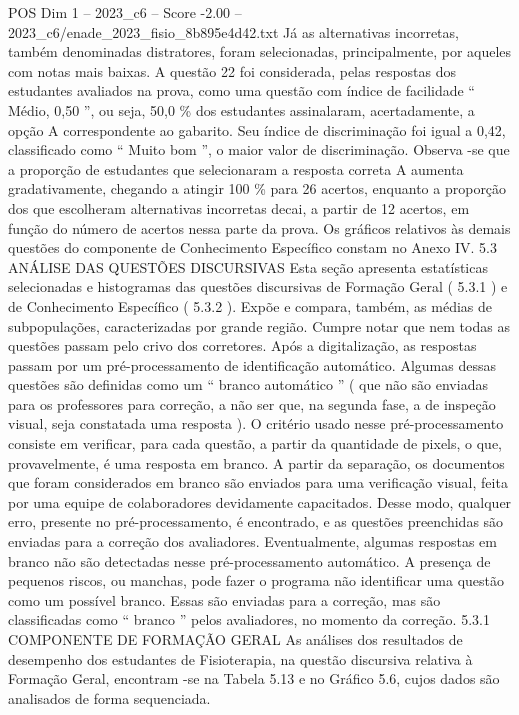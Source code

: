 \begin{textsample}{POS Dim 1 – 2023\_c6 – Score -2.00 – 2023\_c6/enade\_2023\_fisio\_8b895e4d42.txt}
Já as alternativas incorretas, também denominadas distratores, foram selecionadas, principalmente, por aqueles com notas mais baixas.
A questão 22 foi considerada, pelas respostas dos estudantes avaliados na prova, como uma questão com índice de facilidade “ Médio, 0,50 ”, ou seja, 50,0 \% dos estudantes assinalaram, acertadamente, a opção A correspondente ao gabarito.
Seu índice de discriminação foi igual a 0,42, classificado como “ Muito bom ”, o maior valor de discriminação.
Observa -se que a proporção de estudantes que selecionaram a resposta correta A aumenta gradativamente, chegando a atingir 100 \% para 26 acertos, enquanto a proporção dos que escolheram alternativas incorretas decai, a partir de 12 acertos, em função do número de acertos nessa parte da prova.
Os gráficos relativos às demais questões do componente de Conhecimento Específico constam no Anexo IV. 5.3 ANÁLISE DAS QUESTÕES DISCURSIVAS Esta seção apresenta estatísticas selecionadas e histogramas das questões discursivas de Formação Geral ( 5.3.1 ) e de Conhecimento Específico ( 5.3.2 ).
Expõe e compara, também, as médias de subpopulações, caracterizadas por grande região.
Cumpre notar que nem todas as questões passam pelo crivo dos corretores.
Após a digitalização, as respostas passam por um pré-processamento de identificação automático.
Algumas dessas questões são definidas como um “ branco automático ” ( que não são enviadas para os professores para correção, a não ser que, na segunda fase, a de inspeção visual, seja constatada uma resposta ).
O critério usado nesse pré-processamento consiste em verificar, para cada questão, a partir da quantidade de pixels, o que, provavelmente, é uma resposta em branco.
A partir da separação, os documentos que foram considerados em branco são enviados para uma verificação visual, feita por uma equipe de colaboradores devidamente capacitados.
Desse modo, qualquer erro, presente no pré-processamento, é encontrado, e as questões preenchidas são enviadas para a correção dos avaliadores.
Eventualmente, algumas respostas em branco não são detectadas nesse pré-processamento automático.
A presença de pequenos riscos, ou manchas, pode fazer o programa não identificar uma questão como um possível branco.
Essas são enviadas para a correção, mas são classificadas como “ branco ” pelos avaliadores, no momento da correção. 5.3.1 COMPONENTE DE FORMAÇÃO GERAL As análises dos resultados de desempenho dos estudantes de Fisioterapia, na questão discursiva relativa à Formação Geral, encontram -se na Tabela 5.13 e no Gráfico 5.6, cujos dados são analisados de forma sequenciada.

\end{textsample}

